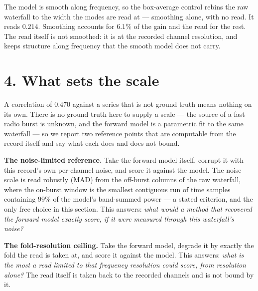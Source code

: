 \documentclass[10pt,letterpaper,twocolumn]{article}
\begin{document}
The model is smooth along frequency, so the box-average control rebins the raw waterfall to the width the modes are read at --- smoothing alone, with no read. It reads \(0.214\). Smoothing accounts for \(6.1\%\) of the gain and the read for the rest. The read itself is not smoothed: it is at the recorded channel resolution, and keeps structure along frequency that the smooth model does not carry.

\section{4. What sets the scale}\label{4-what-sets-the-scale}

A correlation of \(0.470\) against a series that is not ground truth means nothing on its own. There is no ground truth here to supply a scale --- the source of a fast radio burst is unknown, and the forward model is a parametric fit to the same waterfall --- so we report two reference points that are computable from the record itself and say what each does and does not bound.

\textbf{The noise-limited reference.} Take the forward model itself, corrupt it with this record's own per-channel noise, and score it against the model. The noise scale is read robustly (MAD) from the off-burst columns of the raw waterfall, where the on-burst window is the smallest contiguous run of time samples containing \(99\%\) of the model's band-summed power --- a stated criterion, and the only free choice in this section. This answers: \emph{what would a method that recovered the forward model exactly score, if it were measured through this waterfall's noise?}

\textbf{The fold-resolution ceiling.} Take the forward model, degrade it by exactly the fold the read is taken at, and score it against the model. This answers: \emph{what is the most a read limited to that frequency resolution could score, from resolution alone?} The read itself is taken back to the recorded channels and is not bound by it.

\end{document}
